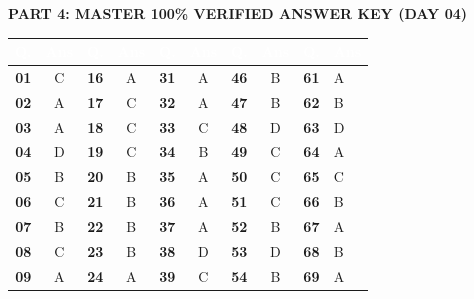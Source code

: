 \documentclass[11pt,a4paper]{article}
\begin{document}
\begin{tcolorbox}[sectionbanner]
  {\large \textbf{\textsf{PART 4: MASTER 100\% VERIFIED ANSWER KEY (DAY 04)}}}
\end{tcolorbox}
\vspace{4pt}

\begin{center}
\renewcommand{\arraystretch}{1.25}
\small
\begin{tabularx}{\textwidth}{|>{\centering\arraybackslash}c|>{\centering\arraybackslash}c|>{\centering\arraybackslash}c|>{\centering\arraybackslash}c|>{\centering\arraybackslash}c|>{\centering\arraybackslash}c|>{\centering\arraybackslash}c|>{\centering\arraybackslash}c|>{\centering\arraybackslash}c|>{\centering\arraybackslash}X|}
\hline
\rowcolor{tableDarkHeader}
\textcolor{white}{\textbf{Q.}} & \textcolor{white}{\textbf{Ans}} & \textcolor{white}{\textbf{Q.}} & \textcolor{white}{\textbf{Ans}} & \textcolor{white}{\textbf{Q.}} & \textcolor{white}{\textbf{Ans}} & \textcolor{white}{\textbf{Q.}} & \textcolor{white}{\textbf{Ans}} & \textcolor{white}{\textbf{Q.}} & \textcolor{white}{\textbf{Ans}} \\
\hline
\rowcolor{white}
\textbf{01} & C & \textbf{16} & A & \textbf{31} & A & \textbf{46} & B & \textbf{61} & A \\
\hline
\rowcolor{tableStripe}
\textbf{02} & A & \textbf{17} & C & \textbf{32} & A & \textbf{47} & B & \textbf{62} & B \\
\hline
\rowcolor{white}
\textbf{03} & A & \textbf{18} & C & \textbf{33} & C & \textbf{48} & D & \textbf{63} & D \\
\hline
\rowcolor{tableStripe}
\textbf{04} & D & \textbf{19} & C & \textbf{34} & B & \textbf{49} & C & \textbf{64} & A \\
\hline
\rowcolor{white}
\textbf{05} & B & \textbf{20} & B & \textbf{35} & A & \textbf{50} & C & \textbf{65} & C \\
\hline
\rowcolor{tableStripe}
\textbf{06} & C & \textbf{21} & B & \textbf{36} & A & \textbf{51} & C & \textbf{66} & B \\
\hline
\rowcolor{white}
\textbf{07} & B & \textbf{22} & B & \textbf{37} & A & \textbf{52} & B & \textbf{67} & A \\
\hline
\rowcolor{tableStripe}
\textbf{08} & C & \textbf{23} & B & \textbf{38} & D & \textbf{53} & D & \textbf{68} & B \\
\hline
\rowcolor{white}
\textbf{09} & A & \textbf{24} & A & \textbf{39} & C & \textbf{54} & B & \textbf{69} & A \\

\end{tabularx}
\end{center}
\end{document}
